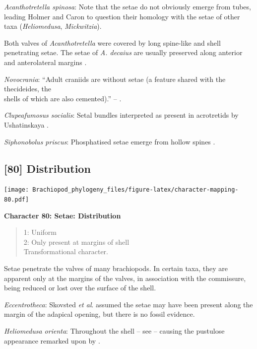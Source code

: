 \documentclass[]{book}
\theoremstyle{definition}
\theoremstyle{definition}
\theoremstyle{definition}
\theoremstyle{remark}
\begin{document}
\emph{Acanthotretella spinosa}: Note that the setae do not obviously
emerge from tubes, leading Holmer and Caron to question their homology
with the setae of other taxa (\emph{Heliomedusa}, \emph{Mickwitzia}).

Both valves of \emph{Acanthotretella} were covered by long spine-like
and shell penetrating setae. The setae of \emph{A. decaius} are usually
preserved along anterior and anterolateral margins
\citep{Hu2010Softpart}.

\emph{Novocrania}: ``Adult craniids are without setae (a feature shared
with the thecideides, the\\
shells of which are also cemented).'' -- \citet{Williams2007PartH}.

\emph{Clupeafumosus socialis}: Setal bundles interpreted as present in
acrotretids by Ushatinskaya \citeyearpar{Ushatinskaya2016Protegulumand}.

\emph{Siphonobolus priscus}: Phosphatised setae emerge from hollow
spines \citep{Popov2009Earlyontogeny}.

\hypertarget{distribution}{%
\subsection*{{[}80{]} Distribution}\label{distribution}}

\texttt{[image: Brachiopod\_phylogeny\_files/figure-latex/character-mapping-80.pdf]}

\textbf{Character 80: Setae: Distribution}

\begin{quote}
1: Uniform\\
2: Only present at margins of shell\\
Transformational character.
\end{quote}

Setae penetrate the valves of many brachiopods. In certain taxa, they
are apparent only at the margins of the valves, in association with the
commissure, being reduced or lost over the surface of the shell.

\emph{Eccentrotheca}: Skovsted \emph{et al}.
\citeyearpar{Skovsted2011Scleritomeconstruction} assumed the setae may
have been present along the margin of the adapical opening, but there is
no fossil evidence.

\emph{Heliomedusa orienta}: Throughout the shell -- see
\citet{Williams2007PartH} -- causing the pustulose appearance remarked
upon by \citet{Chen2007Reinterpretationof}.
\end{document}
